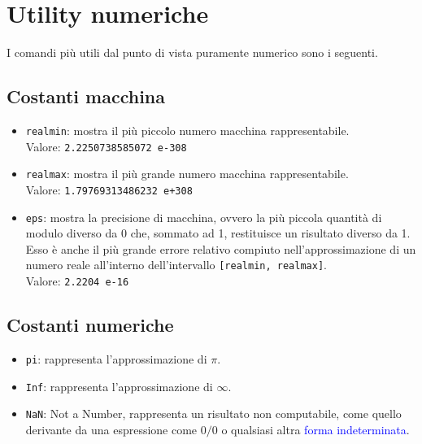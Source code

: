 \documentclass[12pt,a4paper,oneside]{book}
\begin{document}
\newpage

\chapter{Utility numeriche}
I comandi più utili dal punto di vista puramente numerico sono i seguenti.

\section{Costanti macchina}
\begin{itemize}

	\item	\texttt{realmin}: mostra il più piccolo numero macchina rappresentabile. \\
			Valore: \texttt{2.2250738585072 e-308}
	
	\item 	\texttt{realmax}: mostra il più grande numero macchina rappresentabile. \\
			Valore: \texttt{1.79769313486232 e+308}
			
	\item	\texttt{eps}: mostra la precisione di macchina, ovvero la più piccola quantità di modulo diverso da 0
			che, sommato ad 1, restituisce un risultato diverso da 1. Esso è anche il più grande errore relativo
			compiuto nell'approssimazione di un numero reale all'interno dell'intervallo \texttt{[realmin, 
			realmax]}. \\
			Valore: \texttt{2.2204 e-16}

\end{itemize}

\section{Costanti numeriche}
\begin{itemize}

	\item 	\texttt{pi}: rappresenta l'approssimazione di $\pi$.
	
	\item 	\texttt{Inf}: rappresenta l'approssimazione di $\infty$.
			
	\item	\texttt{NaN}: Not a Number, rappresenta un risultato non computabile, come quello derivante da una
			espressione come $0/0$ o qualsiasi altra \textcolor{blue}{forma indeterminata}.
		
\end{itemize}
\end{document}
